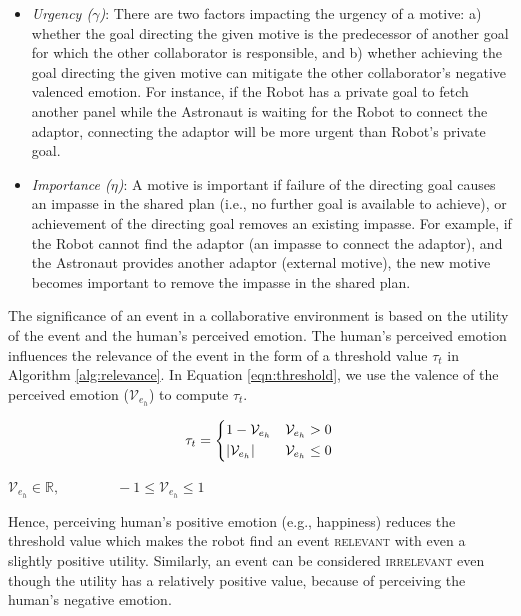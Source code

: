 \documentclass[12pt]{report}
\begin{document}
\begin{itemize}
  \setlength\itemsep{1mm}
  \item \textit{Urgency ($\gamma$)}: There are two factors impacting the urgency
  of a motive: a) whether the goal directing the given motive is the predecessor of
  another goal for which the other collaborator is responsible, and b) whether
  achieving the goal directing the given motive can mitigate the other
  collaborator's negative valenced emotion. For instance, if the Robot has a
  private goal to fetch another panel while the Astronaut is waiting for the
  Robot to connect the adaptor, connecting the adaptor will be more urgent than
  Robot's private goal.
  \item \textit{Importance ($\eta$)}: A motive is important if failure of the
  directing goal causes an impasse in the shared plan (i.e., no further goal is
  available to achieve), or achievement of the directing goal removes an
  existing impasse. For example, if the Robot cannot find the adaptor (an
  impasse to connect the adaptor), and the Astronaut provides another adaptor
  (external motive), the new motive becomes important to remove the impasse in
  the shared plan.
\end{itemize}

The significance of an event in a collaborative environment is based on the
utility of the event and the human's perceived emotion. The human's perceived
emotion influences the relevance of the event in the form of a threshold value
$\tau_{t}$ in Algorithm \ref{alg:relevance}. In Equation \ref{eqn:threshold}, we
use the valence of the perceived emotion ($\mathcal{V}_{e_h}$) to compute
$\tau_{t}$.

\begin{equation}
    \tau_{t}= 
    \begin{dcases}
       1-\mathcal{V}_{e_h} & \mathcal{V}_{e_h} > 0 \\
       |\mathcal{V}_{e_h}| & \mathcal{V}_{e_h} \leq  0
    \end{dcases}
    \label{eqn:threshold}
\end{equation}

\begin{center} 
    $\mathcal{V}_{e_h} \in \mathbb{R}, \qquad\qquad -1 \leq \mathcal{V}_{e_h}
    \leq 1$
\end{center}

Hence, perceiving human's positive emotion (e.g., happiness) reduces the
threshold value which makes the robot find an event \textsc{relevant} with even
a slightly positive utility. Similarly, an event can be considered
\textsc{irrelevant} even though the utility has a relatively positive value,
because of perceiving the human's negative emotion.
\end{document}
